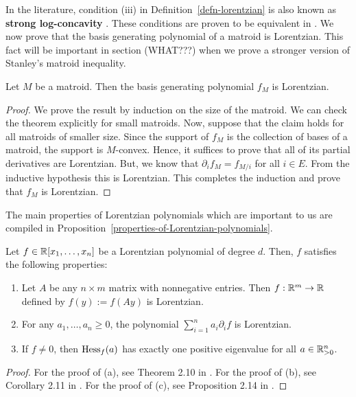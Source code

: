 \documentclass{puthesis-UG}
\begin{document}
In the literature, condition (iii) in Definition~\ref{defn-lorentzian} is also known as \textbf{strong log-concavity} \cite{strongly-log-concave}. These conditions are proven to be equivalent in \cite{lorentzian-polynomials}. We now prove that the basis generating polynomial of a matroid is Lorentzian. This fact will be important in section (WHAT???) when we prove a stronger version of Stanley's matroid inequality. 

\begin{thm} \label{basis-generating-polynomial-is-lorentzian-thm}
	Let $M$ be a matroid. Then the basis generating polynomial $f_M$ is Lorentzian. 
\end{thm}
\begin{proof}
	We prove the result by induction on the size of the matroid. We can check the theorem explicitly for small matroids. Now, suppose that the claim holds for all matroids of smaller size. Since the support of $f_M$ is the collection of bases of a matroid, the support is $M$-convex. Hence, it suffices to prove that all of its partial derivatives are Lorentzian. But, we know that $\partial_i f_M = f_{M / i}$ for all $i \in E$. From the inductive hypothesis this is Lorentzian. This completes the induction and prove that $f_M$ is Lorentzian. 
\end{proof}

The main properties of Lorentzian polynomials which are important to us are compiled in Proposition~\ref{properties-of-Lorentzian-polynomials}. 

\begin{prop} \label{proposition-properties-of-Lorentzian-polynomials}
	Let $f \in \mathbb{R}[x_1, \ldots, x_n]$ be a Lorentzian polynomial of degree $d$. Then, $f$ satisfies the following properties: 
	\begin{enumerate}[label = (\alph*)]
		\item Let $A$ be any $n \times m$ matrix with nonnegative entries. Then $f : \mathbb{R}^m \to \mathbb{R}$ defined by $f(y) := f(Ay)$ is Lorentzian. 

		\item For any $a_1, \ldots, a_n \geq 0$, the polynomial $\sum_{i = 1}^n a_i \partial_i f$ is Lorentzian. 

		\item If $f \neq 0$, then $\operatorname{Hess}_f(a)$ has exactly one positive eigenvalue for all $a \in \mathbb{R}_{> 0}^n$. 
	\end{enumerate}
\end{prop}
\begin{proof}
	For the proof of (a), see Theorem 2.10 in \cite{lorentzian-polynomials}. For the proof of (b), see Corollary 2.11 in \cite{lorentzian-polynomials}. For the proof of (c), see Proposition 2.14 in \cite{lorentzian-polynomials}. 
\end{proof}
\end{document}
